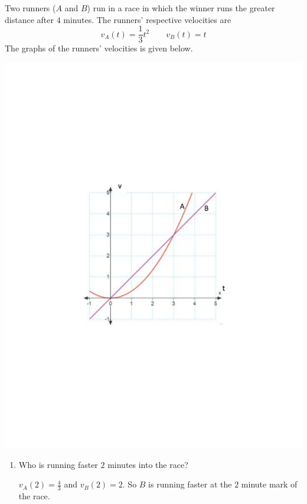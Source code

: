 \documentclass[noinstructornotes]{ximera}
\begin{document}
\newpage



\begin{problem}
Two runners ($A$ and $B$) run in a race in which the winner runs the greater distance after $4$ minutes.  
The runners' respective velocities are
\[
v_A(t) = \frac{1}{3} t^2	\qquad	 v_B(t) = t
\]
The graphs of the runners' velocities is given below.  

\begin{image}
\includegraphics[trim= 270 250 250 250]{Figure6-2-1.pdf}
\end{image}

	\begin{enumerate}
		\item  Who is running faster $2$ minutes into the race?
		\begin{freeResponse}
		$v_A(2) = \frac{4}{3}$ and $v_B(2) = 2$.  
		So $B$ is running faster at the $2$ minute mark of the race.
		\end{freeResponse}
		

\end{enumerate}
\end{problem}
\end{document}

